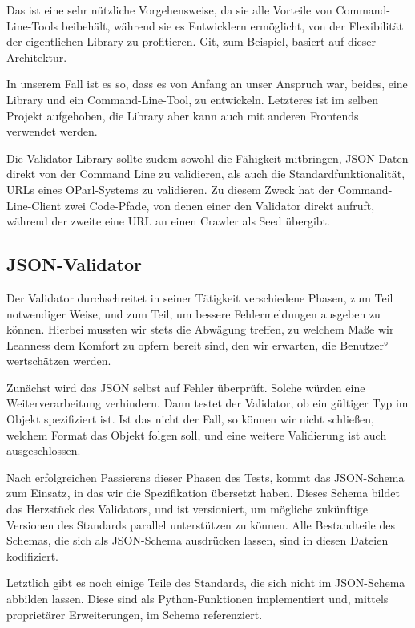 \documentclass[12pt, fleqn]{scrartcl}
\begin{document}
Das ist eine sehr nützliche Vorgehensweise, da sie alle Vorteile von Command-Line-Tools beibehält, während sie es Entwicklern ermöglicht, von der Flexibilität der eigentlichen Library zu profitieren. Git, zum Beispiel, basiert auf dieser Architektur.

In unserem Fall ist es so, dass es von Anfang an unser Anspruch war, beides, eine Library und ein Command-Line-Tool, zu entwickeln. Letzteres ist im selben Projekt aufgehoben, die Library aber kann auch mit anderen Frontends verwendet werden.

Die Validator-Library sollte zudem sowohl die Fähigkeit mitbringen, JSON-Daten direkt von der Command Line zu validieren, als auch die Standardfunktionalität, URLs eines OParl-Systems zu validieren. Zu diesem Zweck hat der Command-Line-Client zwei Code-Pfade, von denen einer den Validator direkt aufruft, während der zweite eine URL an einen Crawler als Seed übergibt.

\subsection{JSON-Validator}

Der Validator durchschreitet in seiner Tätigkeit verschiedene Phasen, zum Teil notwendiger Weise, und zum Teil, um bessere Fehlermeldungen ausgeben zu können. Hierbei mussten wir stets die Abwägung treffen, zu welchem Maße wir Leanness dem Komfort zu opfern bereit sind, den wir erwarten, die Benutzer° wertschätzen werden.

Zunächst wird das JSON selbst auf Fehler überprüft. Solche würden eine Weiterverarbeitung verhindern. Dann testet der Validator, ob ein gültiger Typ im Objekt spezifiziert ist. Ist das nicht der Fall, so können wir nicht schließen, welchem Format das Objekt folgen soll, und eine weitere Validierung ist auch ausgeschlossen.

Nach erfolgreichen Passierens dieser Phasen des Tests, kommt das JSON-Schema zum Einsatz, in das wir die Spezifikation übersetzt haben. Dieses Schema bildet das Herzstück des Validators, und ist versioniert, um mögliche zukünftige Versionen des Standards parallel unterstützen zu können. Alle Bestandteile des Schemas, die sich als JSON-Schema ausdrücken lassen, sind in diesen Dateien kodifiziert.

Letztlich gibt es noch einige Teile des Standards, die sich nicht im JSON-Schema abbilden lassen. Diese sind als Python-Funktionen implementiert und, mittels proprietärer Erweiterungen, im Schema referenziert.
\end{document}
